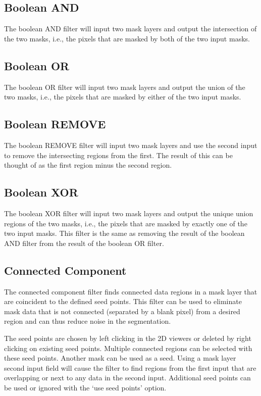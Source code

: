 \documentclass[fleqn,11pt,openany]{book}
\begin{document}
\subsection{Boolean AND}

The boolean AND filter will input two mask layers and output the intersection of the two masks, i.e., the pixels that are masked by both of the two input masks.  

\subsection{Boolean OR}

The boolean OR filter will input two mask layers and output the union of the two masks, i.e., the pixels that are masked by either of the two input masks. 

\subsection{Boolean REMOVE}

The boolean REMOVE filter will input two mask layers and use the second input to remove the intersecting regions from the first.  The result of this can be thought of as the first region minus the second region.  

\subsection{Boolean XOR}

The boolean XOR filter will input two mask layers and output the unique union regions of the two masks, i.e., the pixels that are masked by exactly one of the two input masks. This filter is the same as removing the result of the boolean AND filter from the result of the boolean OR filter.  

\subsection{Connected Component}

The connected component filter finds connected data regions in a mask layer that are coincident to the defined seed points.  This filter can be used to eliminate mask data that is not connected (separated by a blank pixel) from a desired region and can thus reduce noise in the segmentation.  

The seed points are chosen by left clicking in the 2D viewers or deleted by right clicking on existing seed points.  Multiple connected regions can be selected with these seed points.    Another mask can be used as a seed.  Using a mask layer second input field will  cause the filter to find regions from the first input that are overlapping or next to any data in the second input.  Additional seed points can be used or ignored with the `use seed points' option.  
\end{document}
